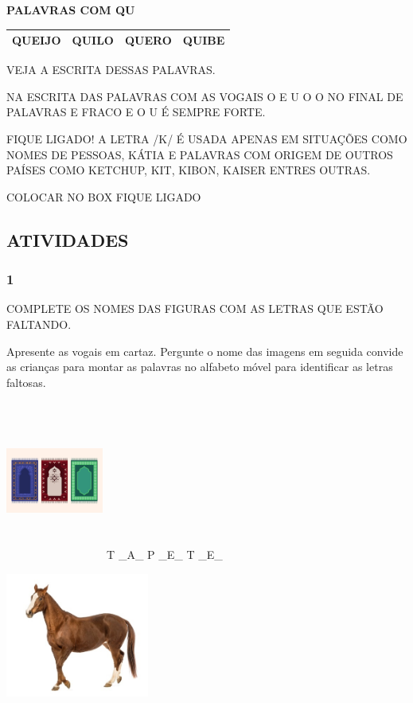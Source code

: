 \textbf{PALAVRAS COM QU}

\begin{longtable}[]{@{}llll@{}}
\toprule
\textbf{QUEIJO} & \textbf{QUILO} & \textbf{QUERO} &
\textbf{QUIBE}\tabularnewline
\bottomrule
\end{longtable}

VEJA A ESCRITA DESSAS PALAVRAS.

NA ESCRITA DAS PALAVRAS COM AS VOGAIS O E U O O NO FINAL DE PALAVRAS E
FRACO E O U É SEMPRE FORTE.

FIQUE LIGADO! A LETRA /K/ É USADA APENAS EM SITUAÇÕES COMO NOMES DE
PESSOAS, KÁTIA E PALAVRAS COM ORIGEM DE OUTROS PAÍSES COMO KETCHUP, KIT,
KIBON, KAISER ENTRES OUTRAS.

COLOCAR NO BOX FIQUE LIGADO

\subsection{ATIVIDADES}\label{atividades}

\subsubsection{1 }\label{section}

COMPLETE OS NOMES DAS FIGURAS COM AS LETRAS QUE ESTÃO FALTANDO.

Apresente as vogais em cartaz. Pergunte o nome das imagens em seguida
convide as crianças para montar as palavras no alfabeto móvel para
identificar as letras faltosas.

\includegraphics[width=1.26518in,height=2.06178in]{media/image1.jpeg} T
\_A\_ P \_E\_ T \_E\_

\includegraphics[width=1.85417in,height=1.60240in]{media/image2.jpeg}


